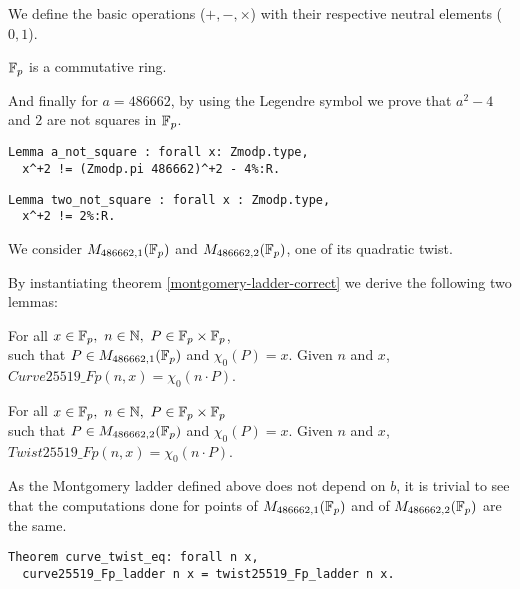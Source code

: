 We define the basic operations ($+, -, \times$) with their respective neutral elements ($0, 1$).
\begin{lemma}
$\mathbb{F}_{p}$ is a commutative ring.
\end{lemma}
%
And finally for $a = 486662$, by using the Legendre symbol we prove that $a^2 - 4$ and $2$ are not squares in $\mathbb{F}_{p}$.
\begin{lstlisting}[language=Coq]
Lemma a_not_square : forall x: Zmodp.type,
  x^+2 != (Zmodp.pi 486662)^+2 - 4%:R.
\end{lstlisting}
\begin{lstlisting}[language=Coq,label=two_not_square]
Lemma two_not_square : forall x : Zmodp.type,
  x^+2 != 2%:R.
\end{lstlisting}
We consider $M_{486662,1}(\mathbb{F}_{p})$ and $M_{486662,2}(\mathbb{F}_{p})$, one of its quadratic twist.


By instantiating theorem \ref{montgomery-ladder-correct} we derive the following two lemmas:
\begin{lemma} For all $x \in \mathbb{F}_{p},\ n \in \mathbb{N},\ P \in \mathbb{F}_{p} \times \mathbb{F}_{p}$,\\
such that $P \in M_{486662,1}(\mathbb{F}_{p})$ and $\chi_0(P) = x$.
Given $n$ and $x$, $Curve25519\_Fp(n,x) = \chi_0(n \cdot P)$.
\end{lemma}
\begin{lemma} For all $x \in \mathbb{F}_{p},\ n \in \mathbb{N},\ P \in \mathbb{F}_{p} \times \mathbb{F}_{p}$\\
such that $P \in M_{486662,2}(\mathbb{F}_{p})$ and $\chi_0(P) = x$.
Given $n$ and $x$, $Twist25519\_Fp(n,x) = \chi_0(n \cdot P)$.
\end{lemma}
As the Montgomery ladder defined above does not depend on $b$, it is trivial to see that the computations done for points of $M_{486662,1}(\mathbb{F}_{p})$ and of $M_{486662,2}(\mathbb{F}_{p})$ are the same.
\begin{lstlisting}[language=Coq]
Theorem curve_twist_eq: forall n x,
  curve25519_Fp_ladder n x = twist25519_Fp_ladder n x.
\end{lstlisting}


